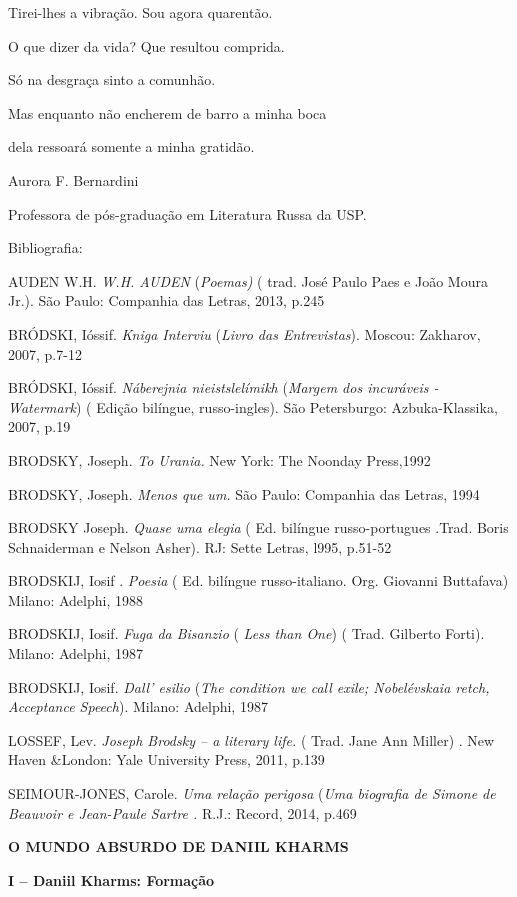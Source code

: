 Tirei-lhes a vibração. Sou agora quarentão.

O que dizer da vida? Que resultou comprida.

Só na desgraça sinto a comunhão.

Mas enquanto não encherem de barro a minha boca

dela ressoará somente a minha gratidão.

Aurora F. Bernardini

Professora de pós-graduação em Literatura Russa da USP.

Bibliografia:

AUDEN W.H. \emph{W.H. AUDEN} (\emph{Poemas)} ( trad. José Paulo Paes e
João Moura Jr.). São Paulo: Companhia das Letras, 2013, p.245

BRÓDSKI, Ióssif. \emph{Kniga Interviu} (\emph{Livro das Entrevistas}).
Moscou: Zakharov, 2007, p.7-12

BRÓDSKI, Ióssif. \emph{Náberejnia nieistslelímikh} (\emph{Margem dos
incuráveis - Watermark}) ( Edição bilíngue, russo-ingles). São
Petersburgo: Azbuka-Klassika, 2007, p.19

BRODSKY, Joseph. \emph{To Urania.} New York: The Noonday Press,1992

BRODSKY, Joseph. \emph{Menos que um.} São Paulo: Companhia das Letras,
1994

BRODSKY Joseph. \emph{Quase uma elegia} ( Ed. bilíngue russo-portugues
.Trad. Boris Schnaiderman e Nelson Asher). RJ: Sette Letras, l995,
p.51-52

BRODSKIJ, Iosif . \emph{Poesia} ( Ed. bilíngue russo-italiano. Org.
Giovanni Buttafava) Milano: Adelphi, 1988

BRODSKIJ, Iosif. \emph{Fuga da Bisanzio} ( \emph{Less than One}) ( Trad.
Gilberto Forti). Milano: Adelphi, 1987

BRODSKIJ, Iosif. \emph{Dall' esilio} (\emph{The condition we call exile;
Nobelévskaia retch, Acceptance Speech}). Milano: Adelphi, 1987

LOSSEF, Lev. \emph{Joseph Brodsky -- a literary life.} ( Trad. Jane Ann
Miller) . New Haven \&London: Yale University Press, 2011, p.139

SEIMOUR-JONES, Carole. \emph{Uma relação perigosa} (\emph{Uma biografia
de Simone de Beauvoir e Jean-Paule Sartre .} R.J.: Record, 2014, p.469

\textbf{O MUNDO ABSURDO DE DANIIL KHARMS}

\textbf{I -- Daniil Kharms: Formação}

